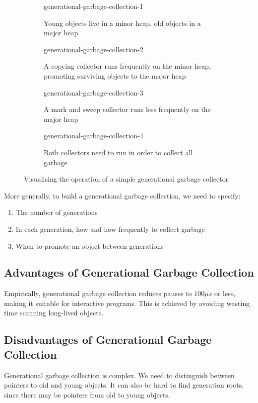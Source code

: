\begin{figure}
    \centering
    \begin{subfigure}{0.48\textwidth}
        {generational-garbage-collection-1}
        \caption{Young objects live in a minor heap, old objects in a major heap}
    \end{subfigure}
    \begin{subfigure}{0.48\textwidth}
        {generational-garbage-collection-2}
        \caption{A copying collector runs frequently on the minor heap, promoting surviving objects to the major heap}
    \end{subfigure}
    \begin{subfigure}{0.48\textwidth}
        {generational-garbage-collection-3}
        \caption{A mark and sweep collector runs less frequently on the major heap}
    \end{subfigure}
    \begin{subfigure}{0.48\textwidth}
        {generational-garbage-collection-4}
        \caption{Both collectors need to run in order to collect all garbage}
    \end{subfigure}
    \caption{Visualising the operation of a simple generational garbage collector}
    \label{fig:generation-garbage-collection}
\end{figure}

More generally, to build a generational garbage collection, we need to specify:
\begin{enumerate}
    \item The number of generations
    \item In each generation, how and how frequently to collect garbage
    \item When to promote an object between generations
\end{enumerate}

\subsection{Advantages of Generational Garbage Collection}
Empirically, generational garbage collection reduces pauses to $100\mu$$s$ or less, making it suitable for interactive programs. This is achieved by avoiding wasting time scanning long-lived objects.

\subsection{Disadvantages of Generational Garbage Collection}
Generational garbage collection is complex. We need to distinguish between pointers to old and young objects. It can also be hard to find generation roots, since there may be pointers from old to young objects.

